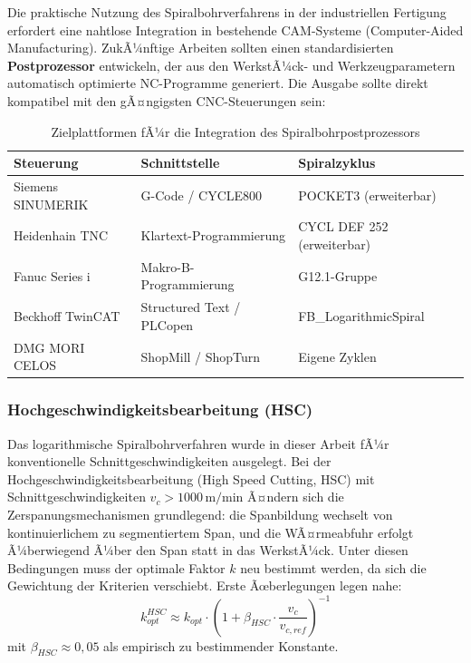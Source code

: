 ﻿\documentclass[12pt,a4paper]{article}
\begin{document}
Die praktische Nutzung des Spiralbohrverfahrens in der industriellen Fertigung erfordert eine nahtlose Integration in bestehende CAM-Systeme (Computer-Aided Manufacturing). ZukÃ¼nftige Arbeiten sollten einen standardisierten \textbf{Postprozessor} entwickeln, der aus den WerkstÃ¼ck- und Werkzeugparametern automatisch optimierte NC-Programme generiert. Die Ausgabe sollte direkt kompatibel mit den gÃ¤ngigsten CNC-Steuerungen sein:

\begin{table}[H]
    \centering
    \begin{tabular}{|l|l|l|}
        \hline
        \textbf{Steuerung} & \textbf{Schnittstelle} & \textbf{Spiralzyklus} \\
        \hline
        Siemens SINUMERIK & G-Code / CYCLE800 & POCKET3 (erweiterbar) \\
        Heidenhain TNC & Klartext-Programmierung & CYCL DEF 252 (erweiterbar) \\
        Fanuc Series i & Makro-B-Programmierung & G12.1-Gruppe \\
        Beckhoff TwinCAT & Structured Text / PLCopen & FB\_LogarithmicSpiral \\
        DMG MORI CELOS & ShopMill / ShopTurn & Eigene Zyklen \\
        \hline
    \end{tabular}
    \caption{Zielplattformen fÃ¼r die Integration des Spiralbohrpostprozessors}
\end{table}

\subsubsection{Hochgeschwindigkeitsbearbeitung (HSC)}

Das logarithmische Spiralbohrverfahren wurde in dieser Arbeit fÃ¼r konventionelle Schnittgeschwindigkeiten ausgelegt. Bei der Hochgeschwindigkeitsbearbeitung (High Speed Cutting, HSC) mit Schnittgeschwindigkeiten $v_c > 1000\,\text{m/min}$ Ã¤ndern sich die Zerspanungsmechanismen grundlegend: die Spanbildung wechselt von kontinuierlichem zu segmentiertem Span, und die WÃ¤rmeabfuhr erfolgt Ã¼berwiegend Ã¼ber den Span statt in das WerkstÃ¼ck. Unter diesen Bedingungen muss der optimale Faktor $k$ neu bestimmt werden, da sich die Gewichtung der Kriterien verschiebt. Erste Ãœberlegungen legen nahe:
\begin{equation}
    k_{opt}^{HSC} \approx k_{opt} \cdot \left(1 + \beta_{HSC} \cdot \frac{v_c}{v_{c,ref}}\right)^{-1}
\end{equation}
mit $\beta_{HSC} \approx 0{,}05$ als empirisch zu bestimmender Konstante.
\end{document}
